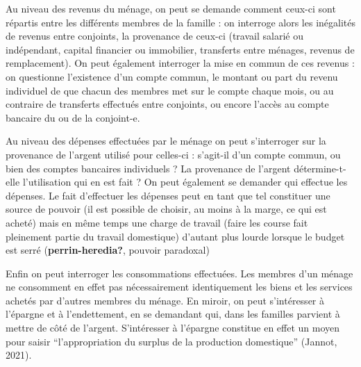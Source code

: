 \documentclass[
  12pt,
]{book}
\begin{document}
Au niveau des revenus du ménage, on peut se demande comment ceux-ci sont
répartis entre les différents membres de la famille : on interroge alors
les inégalités de revenus entre conjoints, la provenance de ceux-ci
(travail salarié ou indépendant, capital financier ou immobilier,
transferts entre ménages, revenus de remplacement). On peut également
interroger la mise en commun de ces revenus : on questionne l'existence
d'un compte commun, le montant ou part du revenu individuel de que
chacun des membres met sur le compte chaque mois, ou au contraire de
transferts effectués entre conjoints, ou encore l'accès au compte
bancaire du ou de la conjoint-e.

Au niveau des dépenses effectuées par le ménage on peut s'interroger sur
la provenance de l'argent utilisé pour celles-ci : s'agit-il d'un compte
commun, ou bien des comptes bancaires individuels ? La provenance de
l'argent détermine-t-elle l'utilisation qui en est fait ? On peut
également se demander qui effectue les dépenses. Le fait d'effectuer les
dépenses peut en tant que tel constituer une source de pouvoir (il est
possible de choisir, au moins à la marge, ce qui est acheté) mais en
même temps une charge de travail (faire les course fait pleinement
partie du travail domestique) d'autant plus lourde lorsque le budget est
serré (\textbf{perrin-heredia?}, pouvoir paradoxal)

Enfin on peut interroger les consommations effectuées. Les membres d'un
ménage ne consomment en effet pas nécessairement identiquement les biens
et les services achetés par d'autres membres du ménage. En miroir, on
peut s'intéresser à l'épargne et à l'endettement, en se demandant qui,
dans les familles parvient à mettre de côté de l'argent. S'intéresser à
l'épargne constitue en effet un moyen pour saisir ``l'appropriation du
surplus de la production domestique'' (Jannot, 2021).

\end{document}

